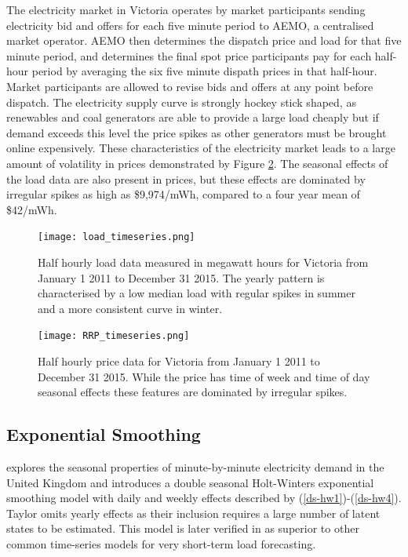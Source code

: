 \documentclass[12pt,a4paper]{article}%
\numberwithin{equation}{section}
\begin{document}
The electricity market in Victoria operates by market participants sending electricity bid and offers for each five minute period to  AEMO, a centralised market operator. AEMO then determines the dispatch price and load for that five minute period, and determines the final spot price participants pay for each half-hour period by averaging the six five minute dispath prices in that half-hour. Market participants are allowed to revise bids and offers at any point before dispatch. The electricity supply curve is strongly hockey stick shaped, as renewables and coal generators are able to provide a large load cheaply but if demand exceeds this level the price spikes as other generators must be brought online expensively. These characteristics of the electricity market leads to a large amount of volatility in prices demonstrated by Figure \ref{fig:rrpplot}. The seasonal effects of the load data are also present in prices, but these effects are dominated by irregular spikes as high as \$9,974/mWh, compared to a four year mean of \$42/mWh.

\begin{figure}[h]
\centering
\texttt{[image: load\_timeseries.png]}
\caption{Half hourly load data measured in megawatt hours for Victoria from January 1 2011 to December 31 2015. The yearly pattern is characterised by a low median load with regular spikes in summer and a more consistent curve in winter.}
\label{fig:loadplot}
\end{figure}

\begin{figure}[h]
\centering
\texttt{[image: RRP\_timeseries.png]}
\caption{Half hourly price data for Victoria from January 1 2011 to December 31 2015. While the price has time of week and time of day seasonal effects these features are dominated by irregular spikes.}
\label{fig:rrpplot}
\end{figure}

\subsection{Exponential Smoothing}

\citet{Taylor2003} explores the seasonal properties of minute-by-minute electricity demand in the United Kingdom and introduces a double seasonal Holt-Winters exponential smoothing model with daily and weekly effects described by (\ref{ds-hw1})-(\ref{ds-hw4}). Taylor omits yearly effects as their inclusion requires a large number of latent states to be estimated. This model is later verified in \citet{Taylor2008} as superior to other common time-series models for very short-term load forecasting.
\end{document}
